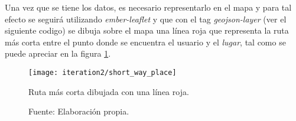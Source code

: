 %

Una vez que se tiene los datos, es necesario representarlo en el mapa y para tal efecto se seguirá utilizando \emph{ember-leaflet} y que con el tag \emph{geojson-layer} (ver el siguiente codigo) se dibuja sobre el mapa una línea roja que representa la ruta más corta entre el punto donde se encuentra el usuario y el \emph{lugar}, tal como se puede apreciar en la figura \ref{fig:short_way_place}.
%


\begin{figure}[H]
 \begin{center}
   \texttt{[image: iteration2/short\_way\_place]}
   \caption{Ruta más corta dibujada con una línea roja.}
   \label{fig:short_way_place}
   \caption*{Fuente: Elaboración propia.}
 \end{center}
\end{figure}



